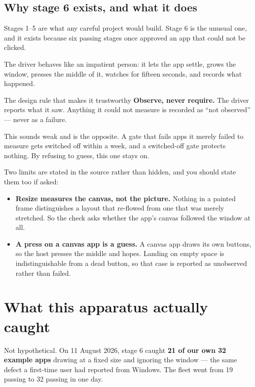 \documentclass[11pt,a4paper]{report}
\begin{document}
\subsection{Why stage 6 exists, and what it does}

Stages 1--5 are what any careful project would build. Stage 6 is the
unusual one, and it exists because six passing stages once approved an app
that could not be clicked.

The driver behaves like an impatient person: it lets the app settle, grows
the window, presses the middle of it, watches for fifteen seconds, and
records what happened.

\begin{plainbox}{The design rule that makes it trustworthy}
\textbf{Observe, never require.} The driver reports what it saw. Anything it
could not measure is recorded as ``not observed'' --- never as a failure.

This sounds weak and is the opposite. A gate that fails apps it merely
failed to measure gets switched off within a week, and a switched-off gate
protects nothing. By refusing to guess, this one stays on.
\end{plainbox}

Two limits are stated in the source rather than hidden, and you should
state them too if asked:

\begin{itemize}[leftmargin=*]
  \item \textbf{Resize measures the canvas, not the picture.} Nothing in a
    painted frame distinguishes a layout that re-flowed from one that was
    merely stretched. So the check asks whether the app's canvas followed
    the window at all.
  \item \textbf{A press on a canvas app is a guess.} A canvas app draws its
    own buttons, so the host presses the middle and hopes. Landing on empty
    space is indistinguishable from a dead button, so that case is reported
    as unobserved rather than failed.
\end{itemize}

\section{What this apparatus actually caught}

Not hypothetical. On 11 August 2026, stage 6 caught \textbf{21 of our own
32 example apps} drawing at a fixed size and ignoring the window --- the
same defect a first-time user had reported from Windows. The fleet went
from 19 passing to 32 passing in one day.
\end{document}
